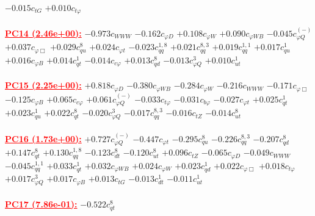 \documentclass{article}
\begin{document}
{$-0.015$}{\rm $c_{tG}$}
{$+0.010$}{\rm $c_{t \varphi}$}
 \nonumber \\ \nonumber \\
\noindent \textcolor{red}{\underline{\bf{PC14} (2.46e+00):}}
{$-0.973$}{\rm $c_{WWW}$}
{$-0.162$}{\rm $c_{\varphi D}$}
{$+0.108$}{\rm $c_{\varphi W}$}
{$+0.090$}{\rm $c_{\varphi WB}$}
{$-0.045$}{\rm $c_{\varphi Q}^{(-)}$}
{$+0.037$}{\rm $c_{\varphi \Box}$}
{$+0.029$}{\rm $c_{qu}^{8}$}
{$+0.024$}{\rm $c_{\varphi t}$}
{$-0.023$}{\rm $c_{qq}^{1,8}$}
{$+0.021$}{\rm $c_{qq}^{8,3}$}
{$+0.019$}{\rm $c_{qq}^{1,1}$}
{$+0.017$}{\rm $c_{qu}^{1}$}
{$+0.016$}{\rm $c_{\varphi B}$}
{$+0.014$}{\rm $c_{qt}^{1}$}
{$-0.014$}{\rm $c_{c \varphi}$}
{$+0.013$}{\rm $c_{qd}^{8}$}
{$-0.013$}{\rm $c_{\varphi Q}^{3}$}
{$+0.010$}{\rm $c_{ut}^{1}$}
 \nonumber \\ \nonumber \\
\noindent \textcolor{red}{\underline{\bf{PC15} (2.25e+00):}}
{$+0.818$}{\rm $c_{\varphi D}$}
{$-0.380$}{\rm $c_{\varphi WB}$}
{$-0.284$}{\rm $c_{\varphi W}$}
{$-0.216$}{\rm $c_{WWW}$}
{$-0.171$}{\rm $c_{\varphi \Box}$}
{$-0.125$}{\rm $c_{\varphi B}$}
{$+0.065$}{\rm $c_{c \varphi}$}
{$+0.061$}{\rm $c_{\varphi Q}^{(-)}$}
{$-0.033$}{\rm $c_{t \varphi}$}
{$-0.031$}{\rm $c_{b \varphi}$}
{$-0.027$}{\rm $c_{\varphi t}$}
{$+0.025$}{\rm $c_{qt}^{1}$}
{$+0.023$}{\rm $c_{qu}^{1}$}
{$+0.022$}{\rm $c_{qt}^{8}$}
{$-0.020$}{\rm $c_{\varphi Q}^{3}$}
{$-0.017$}{\rm $c_{qq}^{8,3}$}
{$-0.016$}{\rm $c_{tZ}$}
{$-0.014$}{\rm $c_{ut}^{8}$}
 \nonumber \\ \nonumber \\
\noindent \textcolor{red}{\underline{\bf{PC16} (1.73e+00):}}
{$+0.727$}{\rm $c_{\varphi Q}^{(-)}$}
{$-0.447$}{\rm $c_{\varphi t}$}
{$-0.295$}{\rm $c_{qu}^{8}$}
{$-0.226$}{\rm $c_{qq}^{8,3}$}
{$-0.207$}{\rm $c_{qd}^{8}$}
{$+0.147$}{\rm $c_{qt}^{8}$}
{$+0.130$}{\rm $c_{qq}^{1,8}$}
{$-0.123$}{\rm $c_{dt}^{8}$}
{$-0.120$}{\rm $c_{ut}^{8}$}
{$+0.096$}{\rm $c_{tZ}$}
{$-0.065$}{\rm $c_{\varphi D}$}
{$-0.049$}{\rm $c_{WWW}$}
{$-0.045$}{\rm $c_{qq}^{1,1}$}
{$+0.033$}{\rm $c_{qt}^{1}$}
{$+0.032$}{\rm $c_{\varphi WB}$}
{$+0.024$}{\rm $c_{\varphi W}$}
{$+0.023$}{\rm $c_{qd}^{1}$}
{$+0.022$}{\rm $c_{\varphi \Box}$}
{$+0.018$}{\rm $c_{t \varphi}$}
{$+0.017$}{\rm $c_{\varphi Q}^{3}$}
{$+0.017$}{\rm $c_{\varphi B}$}
{$+0.013$}{\rm $c_{tG}$}
{$-0.013$}{\rm $c_{dt}^{1}$}
{$-0.011$}{\rm $c_{ut}^{1}$}
 \nonumber \\ \nonumber \\
\noindent \textcolor{red}{\underline{\bf{PC17} (7.86e-01):}}
{$-0.522$}{\rm $c_{qt}^{8}$}
\end{document}
